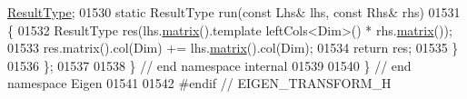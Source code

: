 \begin{DoxyCode}
      \hyperlink{group___geometry___module_class_eigen_1_1_transform}{ResultType};
01530   \textcolor{keyword}{static} ResultType run(\textcolor{keyword}{const} Lhs& lhs, \textcolor{keyword}{const} Rhs& rhs)
01531   \{
01532     ResultType res(lhs.\hyperlink{group___geometry___module_aec8168000a88a807130d41020af98d47}{matrix}().template leftCols<Dim>() * rhs.\hyperlink{group___geometry___module_aec8168000a88a807130d41020af98d47}{matrix}());
01533     res.matrix().col(Dim) += lhs.\hyperlink{group___geometry___module_aec8168000a88a807130d41020af98d47}{matrix}().col(Dim);
01534     \textcolor{keywordflow}{return} res;
01535   \}
01536 \};
01537 
01538 \} \textcolor{comment}{// end namespace internal}
01539 
01540 \} \textcolor{comment}{// end namespace Eigen}
01541 
01542 \textcolor{preprocessor}{#endif // EIGEN\_TRANSFORM\_H}
\end{DoxyCode}
